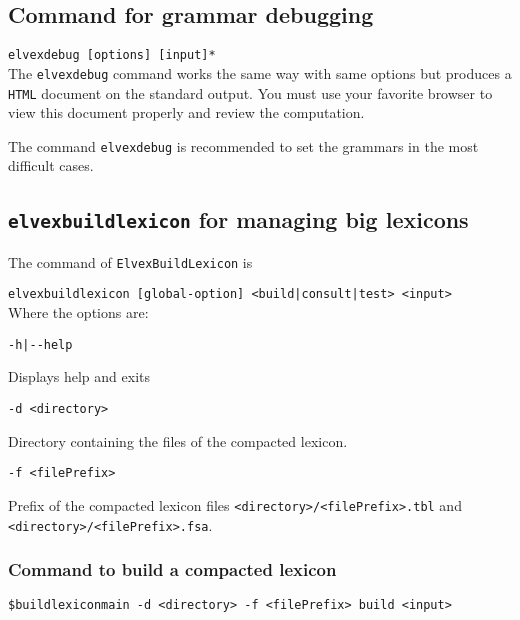 \documentclass[11pt]{article}
\begin{document}
\subsection{Command for grammar debugging}

\noindent
\verb#elvexdebug [options] [input]*#\\

The \texttt{elvexdebug} command works the same way with same options
but produces a \texttt{HTML} document on the standard output. You must
use your favorite browser to view this document properly and review
the computation.

The command \texttt{elvexdebug} is recommended to set the grammars in
the most difficult cases.

\subsection{\texttt{elvexbuildlexicon} for managing big lexicons}

The command of \texttt{ElvexBuildLexicon} is

\noindent
\verb#elvexbuildlexicon [global-option] <build|consult|test> <input>#\\

Where the options are:

\begin{description}
\item \verb#-h|--help#

Displays help and exits

\item \verb#-d <directory>#

  Directory containing the files of the compacted lexicon.

\item \verb#-f <filePrefix>#

  Prefix of the compacted lexicon files \verb#<directory>/<filePrefix>.tbl# and \verb#<directory>/<filePrefix>.fsa#.
  
\end{description}

\subsubsection*{Command to build a compacted lexicon}

\begin{description}
\item \verb#$buildlexiconmain -d <directory> -f <filePrefix> build <input># 
\end{description}
\end{document}
